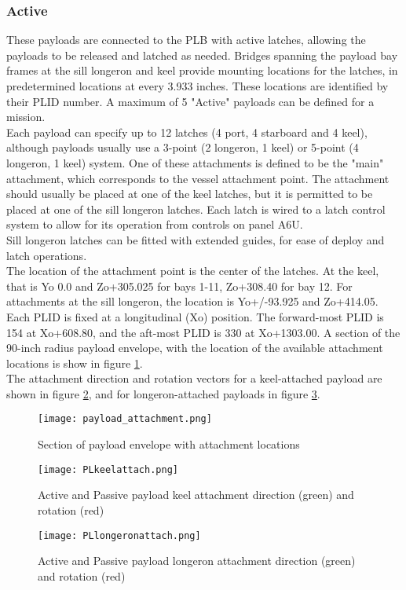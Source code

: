 \documentclass[Space_Shuttle_Vessel_Manual.tex]{subfiles}
\begin{document}
\begin{multicols*}{2}
\subsubsection{Active}
These payloads are connected to the PLB with active latches, allowing the payloads to be released and latched as needed. Bridges spanning the payload bay frames at the sill longeron and keel provide mounting locations for the latches, in predetermined locations at every 3.933 inches. These locations are identified by their PLID number.
A maximum of 5 "Active" payloads can be defined for a mission.
\\
Each payload can specify up to 12 latches (4 port, 4 starboard and 4 keel), although payloads usually use a 3-point (2 longeron, 1 keel) or 5-point (4 longeron, 1 keel) system.
One of these attachments is defined to be the "main" attachment, which corresponds to the vessel attachment point. The attachment should usually be placed at one of the keel latches, but it is permitted to be placed at one of the sill longeron latches. Each latch is wired to a latch control system to allow for its operation from controls on panel A6U.
\\
Sill longeron latches can be fitted with extended guides, for ease of deploy and latch operations.
\\
The location of the attachment point is the center of the latches. At the keel, that is Yo 0.0 and Zo+305.025 for bays 1-11, Zo+308.40 for bay 12. For attachments at the sill longeron, the location is Yo+/-93.925 and Zo+414.05. Each PLID is fixed at a longitudinal (Xo) position. The forward-most PLID is 154 at Xo+608.80, and the aft-most PLID is 330 at Xo+1303.00. A section of the 90-inch radius payload envelope, with the location of the available attachment locations is show in figure \ref{fig:payload_attachment}.
\\
The attachment direction and rotation vectors for a keel-attached payload are shown in figure \ref{fig:PLkeelattach}, and for longeron-attached payloads in figure \ref{fig:PLlongeronattach}.
\begin{figure}[H]
  \centering
  \captionsetup{justification=centering}
  \texttt{[image: payload\_attachment.png]}
  \caption{Section of payload envelope with attachment locations}
  \label{fig:payload_attachment}
\end{figure}
\begin{figure}[H]
  \centering
  \captionsetup{justification=centering}
  \texttt{[image: PLkeelattach.png]}
  \caption{Active and Passive payload keel attachment direction (green) and rotation (red)}
  \label{fig:PLkeelattach}
\end{figure}
\begin{figure}[H]
  \centering
  \captionsetup{justification=centering}
  \texttt{[image: PLlongeronattach.png]}
  \caption{Active and Passive payload longeron attachment direction (green) and rotation (red)}
  \label{fig:PLlongeronattach}
\end{figure}



\end{multicols*}
\end{document}
